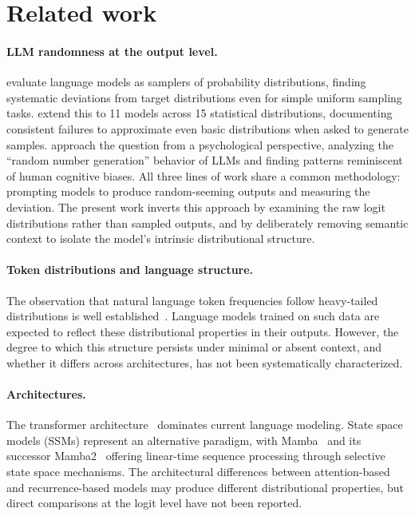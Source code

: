 \documentclass{article}
\begin{document}
\section{Related work}
\label{sec:related}

\paragraph{LLM randomness at the output level.}
\citet{hopkins2023llm_sampling} evaluate language models as samplers of probability distributions, finding systematic deviations from target distributions even for simple uniform sampling tasks. \citet{zhao2026bad_dice} extend this to 11 models across 15 statistical distributions, documenting consistent failures to approximate even basic distributions when asked to generate samples. \citet{coronado2025deterministic} approach the question from a psychological perspective, analyzing the ``random number generation'' behavior of LLMs and finding patterns reminiscent of human cognitive biases. All three lines of work share a common methodology: prompting models to produce random-seeming outputs and measuring the deviation. The present work inverts this approach by examining the raw logit distributions rather than sampled outputs, and by deliberately removing semantic context to isolate the model's intrinsic distributional structure.

\paragraph{Token distributions and language structure.}
The observation that natural language token frequencies follow heavy-tailed distributions is well established~\citep{zipf1949human, piantadosi2014zipf}. Language models trained on such data are expected to reflect these distributional properties in their outputs. However, the degree to which this structure persists under minimal or absent context, and whether it differs across architectures, has not been systematically characterized.

\paragraph{Architectures.}
The transformer architecture~\citep{vaswani2017attention} dominates current language modeling. State space models (SSMs) represent an alternative paradigm, with Mamba~\citep{gu2023mamba} and its successor Mamba2~\citep{dao2024mamba2} offering linear-time sequence processing through selective state space mechanisms. The architectural differences between attention-based and recurrence-based models may produce different distributional properties, but direct comparisons at the logit level have not been reported.
\end{document}
